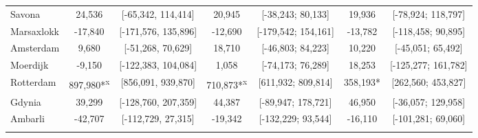 \begin{table}[ht]
\begin{adjustbox}{max width=\textwidth}
\begin{tabular}{lcccccc}
  Savona &   24,536 & [-65,342, 114,414] &   20,945 & [-38,243; 80,133] &   19,936 & [-78,924; 118,797] \\ 
  Marsaxlokk &  -17,840 & [-171,576, 135,896] &  -12,690 & [-179,542; 154,161] &  -13,782 & [-118,458; 90,895] \\ 
  Amsterdam &    9,680 & [-51,268, 70,629] &   18,710 & [-46,803; 84,223] &   10,220 & [-45,051; 65,492] \\ 
  Moerdijk &   -9,150 & [-122,383, 104,084] &    1,058 & [-74,173; 76,289] &   18,253 & [-125,277; 161,782] \\ 
  Rotterdam &  897,980*\textsuperscript{x} & [856,091, 939,870] &  710,873*\textsuperscript{x} & [611,932; 809,814] &  358,193* & [262,560; 453,827] \\ 
  Gdynia &   39,299 & [-128,760, 207,359] &   44,387 & [-89,947; 178,721] &   46,950 & [-36,057; 129,958] \\ 
  Ambarli &  -42,707 & [-112,729, 27,315] &  -19,342 & [-132,229; 93,544] &  -16,110 & [-101,281; 69,060] \\ 
   [2ex] \hline \hline {}\end{tabular} 
 \end{adjustbox} \label{tab:did_results}
\endgroup
\end{table}

